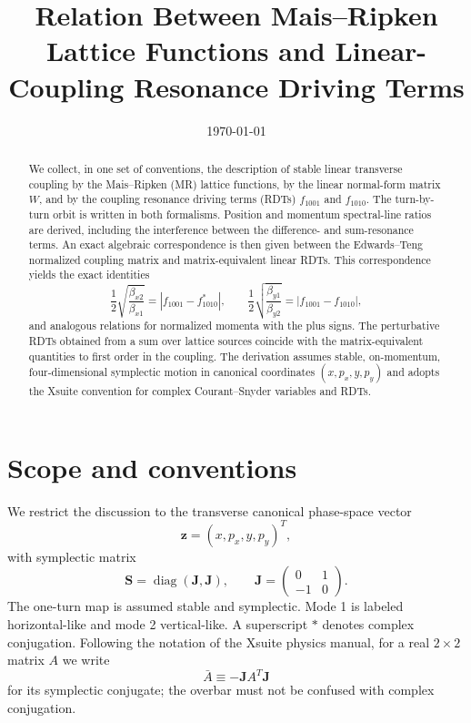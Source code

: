 \documentclass[11pt,a4paper]{article}
\title{Relation Between Mais--Ripken Lattice Functions and Linear-Coupling Resonance Driving Terms}
\author{}
\date{\today}
\newcommand{\diag}{\operatorname{diag}}
\newcommand{\mat}[1]{\bm{#1}}
\begin{document}
\maketitle

\begin{abstract}
We collect, in one set of conventions, the description of stable linear transverse coupling by the Mais--Ripken (MR) lattice functions, by the linear normal-form matrix $W$, and by the coupling resonance driving terms (RDTs) $f_{1001}$ and $f_{1010}$.  The turn-by-turn orbit is written in both formalisms.  Position and momentum spectral-line ratios are derived, including the interference between the difference- and sum-resonance terms.  An exact algebraic correspondence is then given between the Edwards--Teng normalized coupling matrix and matrix-equivalent linear RDTs.  This correspondence yields the exact identities
\[
 \frac12\sqrt{\frac{\beta_{x2}}{\beta_{x1}}}
   =\left|f_{1001}-f_{1010}^{*}\right|,
 \qquad
 \frac12\sqrt{\frac{\beta_{y1}}{\beta_{y2}}}
   =\left|f_{1001}-f_{1010}\right|,
\]
and analogous relations for normalized momenta with the plus signs.  The perturbative RDTs obtained from a sum over lattice sources coincide with the matrix-equivalent quantities to first order in the coupling.  The derivation assumes stable, on-momentum, four-dimensional symplectic motion in canonical coordinates $(x,p_x,y,p_y)$ and adopts the Xsuite convention for complex Courant--Snyder variables and RDTs.
\end{abstract}

\section{Scope and conventions}

We restrict the discussion to the transverse canonical phase-space vector
\begin{equation}
 \mat z=(x,p_x,y,p_y)^T,
\end{equation}
with symplectic matrix
\begin{equation}
 \mat S=\diag(\mat J,\mat J),
 \qquad
 \mat J=\begin{pmatrix}0&1\\-1&0\end{pmatrix}.
\end{equation}
The one-turn map is assumed stable and symplectic.  Mode 1 is labeled horizontal-like and mode 2 vertical-like.  A superscript $*$ denotes complex conjugation.  Following the notation of the Xsuite physics manual, for a real $2\times2$ matrix $A$ we write
\begin{equation}
 \bar A\equiv-\mat J A^T\mat J
\end{equation}
for its symplectic conjugate; the overbar must not be confused with complex
conjugation.
\end{document}
